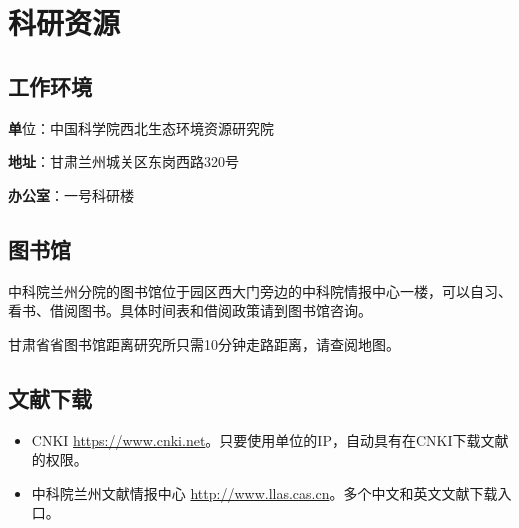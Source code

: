 \documentclass[
]{ctexbook}
\providecommand{\tightlist}{%
  \setlength{\itemsep}{0pt}\setlength{\parskip}{0pt}}
\begin{document}
\hypertarget{res}{%
\chapter{科研资源}\label{res}}

\hypertarget{ux5de5ux4f5cux73afux5883}{%
\section{工作环境}\label{ux5de5ux4f5cux73afux5883}}

\textbf{单}位：中国科学院西北生态环境资源研究院

\textbf{地址}：甘肃兰州城关区东岗西路320号

\textbf{办公室}：一号科研楼

\hypertarget{ux56feux4e66ux9986}{%
\section{图书馆}\label{ux56feux4e66ux9986}}

中科院兰州分院的图书馆位于园区西大门旁边的中科院情报中心一楼，可以自习、看书、借阅图书。具体时间表和借阅政策请到图书馆咨询。

甘肃省省图书馆距离研究所只需10分钟走路距离，请查阅地图。

\hypertarget{ux6587ux732eux4e0bux8f7d}{%
\section{文献下载}\label{ux6587ux732eux4e0bux8f7d}}

\begin{itemize}
\tightlist
\item
  CNKI \url{https://www.cnki.net}。只要使用单位的IP，自动具有在CNKI下载文献的权限。
\item
  中科院兰州文献情报中心 \url{http://www.llas.cas.cn}。多个中文和英文文献下载入口。
\end{itemize}
\end{document}
